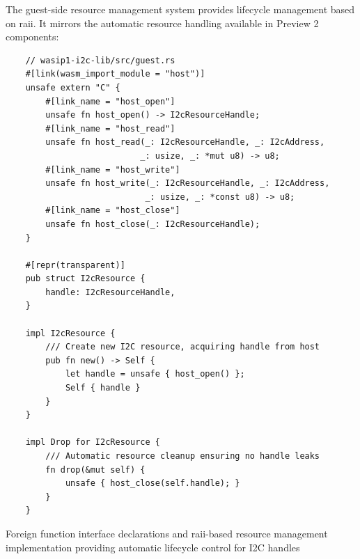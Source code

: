 The guest-side resource management system provides lifecycle management based on \acrshort{raii}. It mirrors the automatic resource handling available in Preview 2 components:

\begin{listing}[H]
    \begin{verbatim}
    // wasip1-i2c-lib/src/guest.rs
    #[link(wasm_import_module = "host")]
    unsafe extern "C" {
        #[link_name = "host_open"]
        unsafe fn host_open() -> I2cResourceHandle;
        #[link_name = "host_read"]
        unsafe fn host_read(_: I2cResourceHandle, _: I2cAddress, 
                           _: usize, _: *mut u8) -> u8;
        #[link_name = "host_write"]
        unsafe fn host_write(_: I2cResourceHandle, _: I2cAddress, 
                            _: usize, _: *const u8) -> u8;
        #[link_name = "host_close"]
        unsafe fn host_close(_: I2cResourceHandle);
    }
    
    #[repr(transparent)]
    pub struct I2cResource {
        handle: I2cResourceHandle,
    }

    impl I2cResource {
        /// Create new I2C resource, acquiring handle from host
        pub fn new() -> Self {
            let handle = unsafe { host_open() };
            Self { handle }
        }
    }
    
    impl Drop for I2cResource {
        /// Automatic resource cleanup ensuring no handle leaks
        fn drop(&mut self) {
            unsafe { host_close(self.handle); }
        }
    }
    \end{verbatim}
    \caption{Foreign function interface declarations and \acrshort{raii}-based resource management implementation providing automatic lifecycle control for I2C handles}
    \label{lst:guest-ffi-declarations}
\end{listing}

